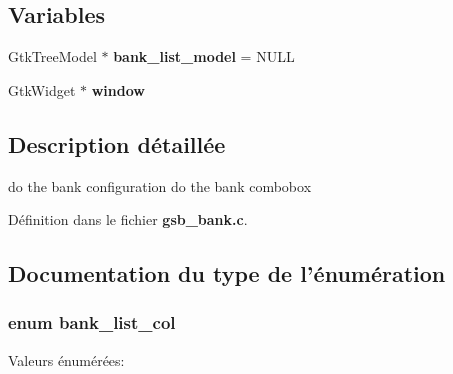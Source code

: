 \subsection*{Variables}
\begin{DoxyCompactItemize}
\item 
GtkTreeModel $\ast$ {\bf bank\_\-list\_\-model} = NULL
\item 
GtkWidget $\ast$ {\bf window}
\end{DoxyCompactItemize}


\subsection{Description détaillée}
do the bank configuration do the bank combobox 

Définition dans le fichier {\bf gsb\_\-bank.c}.



\subsection{Documentation du type de l'énumération}
\subsubsection[{bank\_\-list\_\-col}]{\setlength{\rightskip}{0pt plus 5cm}enum {\bf bank\_\-list\_\-col}}\label{gsb__bank_8c_a78fbfb0d1e05ec62c8b73ad231246021}
\begin{Desc}
\item[Valeurs énumérées: ]\par
\begin{description}
\item[{\em 
BANK\_\-VIEW\_\-NAME\_\-COL\label{gsb__bank_8c_a78fbfb0d1e05ec62c8b73ad231246021a5ea690dfc0cc1ebd0d174597d342f743}
}]\item[{\em 
BANK\_\-TALKER\_\-COL\label{gsb__bank_8c_a78fbfb0d1e05ec62c8b73ad231246021a9c09ec058705397b37ab3d2c0652530a}
}]\item[{\em 
BANK\_\-NUMBER\label{gsb__bank_8c_a78fbfb0d1e05ec62c8b73ad231246021a5176121cc926d5c01f033fa5383873da}
}]\item[{\em 
BANK\_\-LIST\_\-COL\_\-NB\label{gsb__bank_8c_a78fbfb0d1e05ec62c8b73ad231246021a8de3f416202f9e946a7edec2e569e2cf}
}]\end{description}
\end{Desc}



